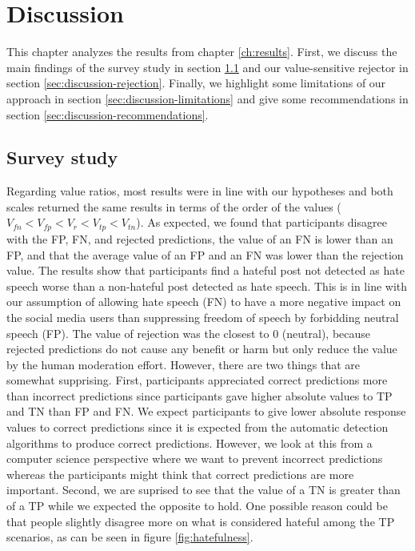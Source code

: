 \chapter{Discussion}
%
This chapter analyzes the results from chapter \ref{ch:results}.
%
First, we discuss the main findings of the survey study in section \ref{sec:discussion-survey} and our value-sensitive rejector in section \ref{sec:discussion-rejection}.
%
Finally, we highlight some limitations of our approach in section \ref{sec:discussion-limitations} and give some recommendations in section \ref{sec:discussion-recommendations}.


\section{Survey study}
\label{sec:discussion-survey}
Regarding value ratios, most results were in line with our hypotheses and both scales returned the same results in terms of the order of the values ($V_{fn} < V_{fp} < V_{r} < V_{tp} < V_{tn}$).
%
As expected, we found that participants disagree with the FP, FN, and rejected predictions, the value of an FN is lower than an FP, and that the average value of an FP and an FN was lower than the rejection value.
%
The results show that participants find a hateful post not detected as hate speech worse than a non-hateful post detected as hate speech.
%
This is in line with our assumption of allowing hate speech (FN) to have a more negative impact on the social media users than suppressing freedom of speech by forbidding neutral speech (FP).
%
The value of rejection was the closest to 0 (neutral), because rejected predictions do not cause any benefit or harm but only reduce the value by the human moderation effort.
%
However, there are two things that are somewhat supprising.
%
First, participants appreciated correct predictions more than incorrect predictions since participants gave higher absolute values to TP and TN than FP and FN.
%
We expect participants to give lower absolute response values to correct predictions since it is expected from the automatic detection algorithms to produce correct predictions.
%
However, we look at this from a computer science perspective where we want to prevent incorrect predictions whereas the participants might think that correct predictions are more important.
%
Second, we are suprised to see that the value of a TN is greater than of a TP while we expected the opposite to hold.
%
One possible reason could be that people slightly disagree more on what is considered hateful among the TP scenarios, as can be seen in figure \ref{fig:hatefulness}.
%

